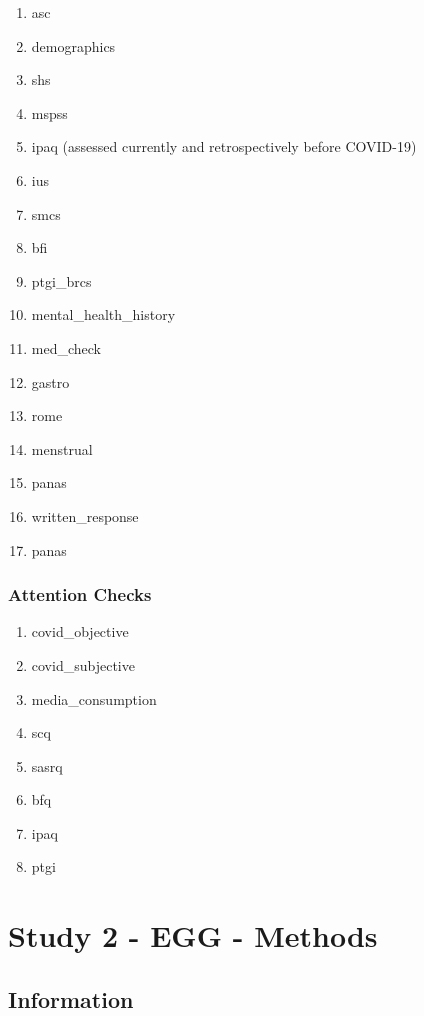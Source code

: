 \documentclass[]{book}
\providecommand{\tightlist}{%
  \setlength{\itemsep}{0pt}\setlength{\parskip}{0pt}}
\begin{document}
\begin{enumerate}
\item
  asc
\item
  demographics
\item
  shs
\item
  mspss
\item
  ipaq (assessed currently and retrospectively before COVID-19)
\item
  ius
\item
  smcs
\item
  bfi
\item
  ptgi\_brcs
\item
  mental\_health\_history
\item
  med\_check
\item
  gastro
\item
  rome
\item
  menstrual
\item
  panas
\item
  written\_response
\item
  panas
\end{enumerate}

\hypertarget{attention-checks}{%
\subsection{Attention Checks}\label{attention-checks}}

\begin{enumerate}
\def\labelenumi{\arabic{enumi}.}
\tightlist
\item
  covid\_objective
\item
  covid\_subjective
\item
  media\_consumption
\item
  scq
\item
  sasrq
\item
  bfq
\item
  ipaq
\item
  ptgi
\end{enumerate}

\hypertarget{study-2---egg---methods}{%
\chapter{Study 2 - EGG - Methods}\label{study-2---egg---methods}}

\hypertarget{information-1}{%
\section{Information}\label{information-1}}
\end{document}
